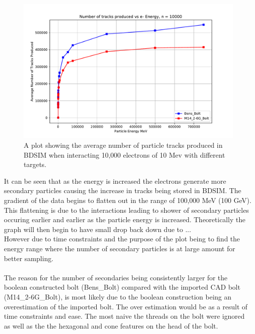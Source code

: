 \documentclass[12pt,a4paper]{article}
\begin{document}
\begin{figure}[h!]
\centering
\includegraphics[width=1\textwidth]{Images//CAD_Screw//boltcount.pdf}
\caption[width=\columnwidth]{A plot showing the average number of particle tracks produced in BDSIM when interacting 10,000 electrons of 10 Mev with different targets.}
\label{boltcount}
\end{figure}

\noindent It can be seen that as the energy is increased the electrons generate more secondary particles causing the increase in tracks being stored in BDSIM. The gradient of the data begins to flatten out in the range of 100,000 MeV (100 GeV). This flattening is due to the interactions leading to shower of secondary particles occuring earlier and earlier as the particle energy is increased. Theoretically the graph will then begin to have small drop back down due to ...\\
However due to time constraints and the purpose of the plot being to find the energy range where the number of secondary particles is at large amount for better sampling.
\\\\
\noindent The reason for the number of secondaries being consistently larger for the boolean constructed bolt (Bens\_Bolt) compared with the imported CAD bolt (M14\_2-6G\_Bolt), is most likely due to the boolean construction being an overestimation of the imported bolt. The over estimation would be as a result of  time constraints and ease. The most naive  the threads on the bolt were ignored as well as the the hexagonal and cone features on the head of the bolt.
\end{document}
